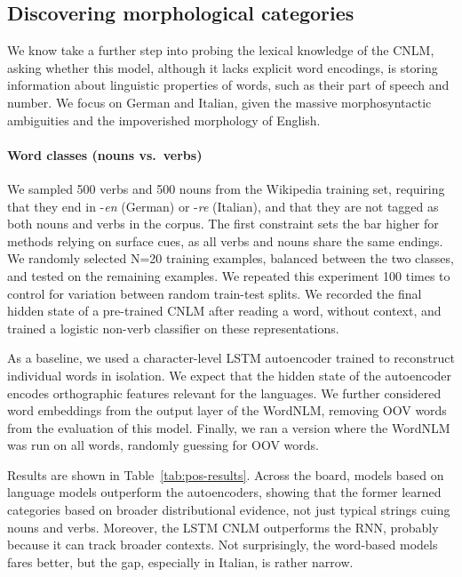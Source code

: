 \subsection{Discovering morphological categories}
\label{sec:categories}

We know take a further step into probing the lexical knowledge of the
CNLM, asking whether this model, although it lacks explicit word
encodings, is storing information about linguistic properties of
words, such as their part of speech and number. We focus on German and
Italian, given the massive morphosyntactic ambiguities and the
impoverished morphology of English.

\paragraph{Word classes (nouns vs.~verbs)}

We sampled 500 verbs and 500 nouns from the Wikipedia training set,
requiring that they end in -\emph{en} (German) or -\emph{re}
(Italian), and that they are not tagged as both nouns and verbs in the
corpus. The first constraint sets the bar higher for methods relying
on surface cues, as all verbs and nouns share the same endings. We
randomly selected N=20 training examples, balanced between the two
classes, and tested on the remaining examples.  We repeated this
experiment 100 times to control for variation between random
train-test splits. We recorded the final hidden state of a pre-trained
CNLM after reading a word, without context, and trained a logistic
non-verb classifier on these representations.

As a baseline, we used a character-level LSTM autoencoder trained to
reconstruct individual words in isolation.  We expect that the hidden
state of the autoencoder encodes orthographic features relevant for
the languages.  We further considered word embeddings from the output
layer of the WordNLM, removing OOV words from the evaluation of this
model. Finally, we ran a version where the WordNLM was run on all words,
randomly guessing for OOV words.

Results are shown in Table~\ref{tab:pos-results}.  Across the board,
models based on language models outperform the autoencoders, showing
that the former learned categories based on broader distributional
evidence, not just typical strings cuing nouns and verbs. Moreover,
the LSTM CNLM outperforms the RNN, probably because it can track
broader contexts. Not surprisingly, the word-based models fares
better, but the gap, especially in Italian, is rather narrow.

